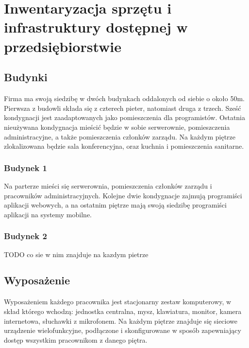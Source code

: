 \section{Inwentaryzacja sprzętu i infrastruktury dostępnej w przedsiębiorstwie}
\subsection{Budynki}
\paragraph{}
Firma ma swoją siedzibę w dwóch budynkach oddalonych od siebie o około 50m. Pierwsza z budowli składa się z czterech pieter, natomiast druga z trzech. Sześć kondygnacji jest zaadaptowanych jako pomieszczenia dla programistów. Ostatnia nieużywana kondygnacja mieścić będzie w sobie serwerownie, pomieszczenia administracyjne, a także pomieszczenia członków zarządu. Na każdym piętrze zlokalizowana będzie sala konferencyjna, oraz kuchnia i pomieszczenia sanitarne.
\paragraph{}
\subsubsection {Budynek 1} 
Na parterze mieści się serwerownia, pomieszczenia członków zarządu i pracowników administracyjnych. Kolejne dwie kondygnacje zajmują programiści aplikacji webowych, a na ostatnim piętrze mają swoją siedzibę programiści aplikacji na systemy mobilne.

\subsubsection{Budynek 2} 
TODO co sie w nim znajduje na kazdym pietrze \\

\subsection{Wyposażenie}
\paragraph{}
Wyposażeniem każdego pracownika jest stacjonarny zestaw komputerowy, w skład którego wchodzą: jednostka centralna, mysz, klawiatura, monitor, kamera internetowa, słuchawki z mikrofonem.
Na każdym piętrze znajduje się sieciowe urządzenie wielofunkcyjne, podłączone i skonfigurowane w sposób zapewniający dostęp wszystkim pracownikom z danego piętra.

